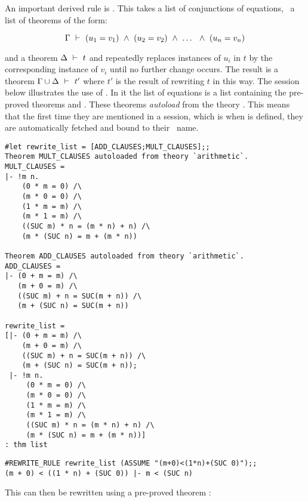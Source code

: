 An important  derived  rule  is  .    This  takes  a  list of
conjunctions of equations, \ie\ a list of theorems of the  form:  

\[ \Gamma\ \vdash\  (u_1 = v_1) \ \wedge\  (u_2 = v_2) \ \wedge\  \ldots\ \ \wedge\  (u_n  = v_n)\]

\noindent  and a theorem
$\Delta\ \vdash\  t$  and  repeatedly  replaces  instances  of  $u_i$ in  $t$ by the
corresponding instance of $v_i$ until no further change occurs.   The result is
a theorem $\Gamma\cup\Delta\ \vdash\  t'$ where $t'$ is the result  of rewriting $t$
in this way.  The session below illustrates the use of  .  In
it the list of equations is a list  containing the pre-proved
theorems   and   .     These  theorems  {\it
autoload\/} from the theory .   This  means that  the first time
they are mentioned in a session, which  is when   is defined,
they are automatically fetched and bound to their \ML\ name.

\begin{session}\begin{verbatim}
#let rewrite_list = [ADD_CLAUSES;MULT_CLAUSES];;
Theorem MULT_CLAUSES autoloaded from theory `arithmetic`.
MULT_CLAUSES = 
|- !m n.
    (0 * m = 0) /\
    (m * 0 = 0) /\
    (1 * m = m) /\
    (m * 1 = m) /\
    ((SUC m) * n = (m * n) + n) /\
    (m * (SUC n) = m + (m * n))

Theorem ADD_CLAUSES autoloaded from theory `arithmetic`.
ADD_CLAUSES = 
|- (0 + m = m) /\
   (m + 0 = m) /\
   ((SUC m) + n = SUC(m + n)) /\
   (m + (SUC n) = SUC(m + n))

rewrite_list = 
[|- (0 + m = m) /\
    (m + 0 = m) /\
    ((SUC m) + n = SUC(m + n)) /\
    (m + (SUC n) = SUC(m + n));
 |- !m n.
     (0 * m = 0) /\
     (m * 0 = 0) /\
     (1 * m = m) /\
     (m * 1 = m) /\
     ((SUC m) * n = (m * n) + n) /\
     (m * (SUC n) = m + (m * n))]
: thm list
\end{verbatim}\end{session}

\begin{session}\begin{verbatim}
#REWRITE_RULE rewrite_list (ASSUME "(m+0)<(1*n)+(SUC 0)");;
(m + 0) < ((1 * n) + (SUC 0)) |- m < (SUC n)
\end{verbatim}\end{session}

\noindent This can then be rewritten using a pre-proved theorem :

